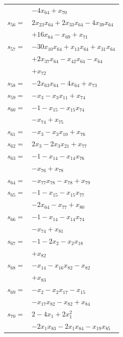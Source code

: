 \begin{longtable}{@{}r@{\;}l@{}}
 & \(\displaystyle -4x_{64} +x_{70}\) \\[3pt]
\(s_{56}=\) & \(\displaystyle 2x_{23}x_{64} +2x_{33}x_{64} -4x_{39}x_{64}\) \\
 & \(\displaystyle +16x_{64} -x_{69} +x_{71}\) \\[3pt]
\(s_{57}=\) & \(\displaystyle -30x_{10}x_{64} +x_{13}x_{64} +x_{31}x_{64}\) \\
 & \(\displaystyle +2x_{37}x_{64} -x_{42}x_{64} -x_{64}\) \\
 & \(\displaystyle +x_{72}\) \\[3pt]
\(s_{58}=\) & \(\displaystyle -2x_{63}x_{64} -4x_{64} +x_{73}\) \\[3pt]
\(s_{59}=\) & \(\displaystyle -x_{3} -x_{3}x_{11} +x_{74}\) \\[3pt]
\(s_{60}=\) & \(\displaystyle -1 -x_{15} -x_{15}x_{74}\) \\
 & \(\displaystyle -x_{74} +x_{75}\) \\[3pt]
\(s_{61}=\) & \(\displaystyle -x_{3} -x_{3}x_{10} +x_{76}\) \\[3pt]
\(s_{62}=\) & \(\displaystyle 2x_{3} -2x_{3}x_{21} +x_{77}\) \\[3pt]
\(s_{63}=\) & \(\displaystyle -1 -x_{14} -x_{14}x_{76}\) \\
 & \(\displaystyle -x_{76} +x_{78}\) \\[3pt]
\(s_{64}=\) & \(\displaystyle -x_{77}x_{78} -x_{78} +x_{79}\) \\[3pt]
\(s_{65}=\) & \(\displaystyle -1 -x_{15} -x_{15}x_{77}\) \\
 & \(\displaystyle -2x_{64} -x_{77} +x_{80}\) \\[3pt]
\(s_{66}=\) & \(\displaystyle -1 -x_{14} -x_{14}x_{74}\) \\
 & \(\displaystyle -x_{74} +x_{81}\) \\[3pt]
\(s_{67}=\) & \(\displaystyle -1 -2x_{2} -x_{2}x_{18}\) \\
 & \(\displaystyle +x_{82}\) \\[3pt]
\(s_{68}=\) & \(\displaystyle -x_{14} -x_{16}x_{82} -x_{82}\) \\
 & \(\displaystyle +x_{83}\) \\[3pt]
\(s_{69}=\) & \(\displaystyle -x_{2} -x_{2}x_{17} -x_{15}\) \\
 & \(\displaystyle -x_{17}x_{82} -x_{82} +x_{84}\) \\[3pt]
\(s_{70}=\) & \(\displaystyle 2 -4x_{1} +2x_{1}^{2}\) \\
 & \(\displaystyle -2x_{1}x_{83} -2x_{1}x_{84} -x_{19}x_{85}\) \\

\end{longtable}
